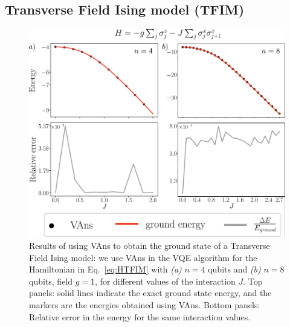 \subsection{Transverse Field Ising model (TFIM)}
\begin{figure}[t!]
\centering
\includegraphics[width=.9\textwidth]{Figures/VANS/Fig6.pdf}
\caption{Results of using VAns to obtain the ground state of a Transverse Field Ising model: we use VAns in the VQE algorithm for the Hamiltonian in Eq.~\ref{eq:HTFIM} with \textit{(a)} $n=4$ qubits and \textit{(b)} $n=8$ qubits, field $g=1$, for different values of the interaction $J$. Top panels: solid lines indicate the exact ground state energy, and the markers are the energies obtained using VAns. Bottom panels: Relative error in the energy for the same interaction values.}
\label{fig:TFIM}
\end{figure}
